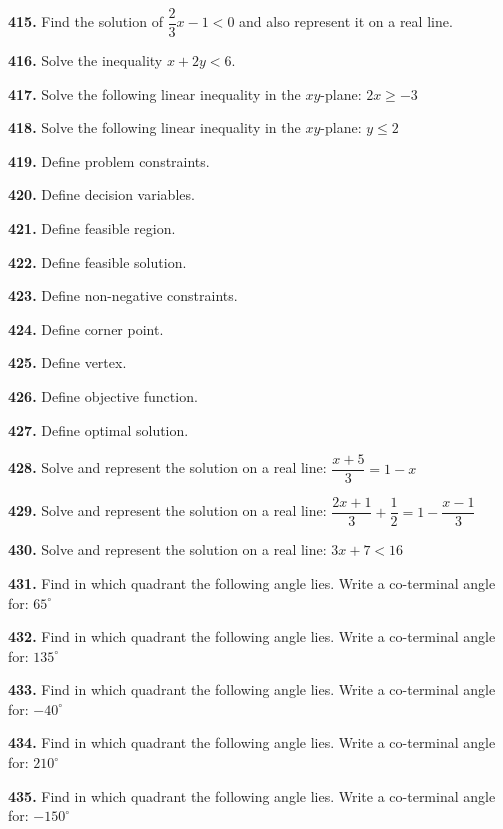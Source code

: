 \documentclass[11pt]{article}
\begin{document}
\bigskip
\noindent\textbf{415.} Find the solution of $\dfrac{2}{3}x-1<0$ and also represent it on a real line.

\bigskip
\noindent\textbf{416.} Solve the inequality $x+2y<6$.

\bigskip
\noindent\textbf{417.} Solve the following linear inequality in the $xy$-plane: $2x\geq-3$

\bigskip
\noindent\textbf{418.} Solve the following linear inequality in the $xy$-plane: $y\leq2$

\bigskip
\noindent\textbf{419.} Define problem constraints.

\bigskip
\noindent\textbf{420.} Define decision variables.

\bigskip
\noindent\textbf{421.} Define feasible region.

\bigskip
\noindent\textbf{422.} Define feasible solution.

\bigskip
\noindent\textbf{423.} Define non-negative constraints.

\bigskip
\noindent\textbf{424.} Define corner point.

\bigskip
\noindent\textbf{425.} Define vertex.

\bigskip
\noindent\textbf{426.} Define objective function.

\bigskip
\noindent\textbf{427.} Define optimal solution.

\bigskip
\noindent\textbf{428.} Solve and represent the solution on a real line: $\dfrac{x+5}{3}=1-x$

\bigskip
\noindent\textbf{429.} Solve and represent the solution on a real line: $\dfrac{2x+1}{3}+\dfrac{1}{2}=1-\dfrac{x-1}{3}$

\bigskip
\noindent\textbf{430.} Solve and represent the solution on a real line: $3x+7<16$

\bigskip
\noindent\textbf{431.} Find in which quadrant the following angle lies. Write a co-terminal angle for: $65^{\circ}$

\bigskip
\noindent\textbf{432.} Find in which quadrant the following angle lies. Write a co-terminal angle for: $135^{\circ}$

\bigskip
\noindent\textbf{433.} Find in which quadrant the following angle lies. Write a co-terminal angle for: $-40^{\circ}$

\bigskip
\noindent\textbf{434.} Find in which quadrant the following angle lies. Write a co-terminal angle for: $210^{\circ}$

\bigskip
\noindent\textbf{435.} Find in which quadrant the following angle lies. Write a co-terminal angle for: $-150^{\circ}$
\end{document}
